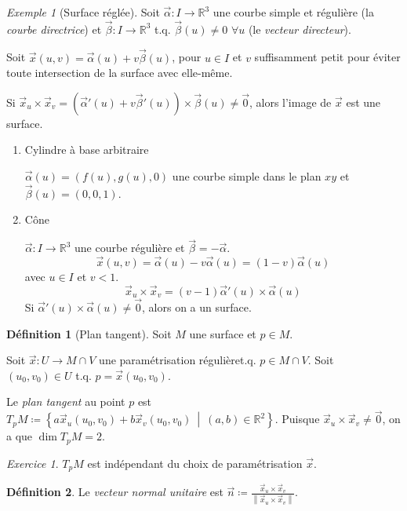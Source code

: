 \documentclass{report}
\theoremstyle{definition}
\newtheorem*{dfn}{D\'efinition}
\theoremstyle{remark}
\newtheorem*{exem}{Exemple}
\newtheorem*{exer}{Exercice}
\def\RR{\mathbb{R}}
\newcommand*{\norme}[1]{\left\|#1\right\|}
\begin{document}
	\begin{exem}[Surface r\'egl\'ee]
		Soit $\vec\alpha:I\to\RR^3$ une courbe simple et  r\'eguli\`ere (la \emph{courbe directrice}) et $\vec\beta:I\to\RR^3$ t.q. $\vec\beta(u)\neq0$ $\forall u$ (le \emph{vecteur directeur}).

		Soit $\vec x(u,v) = \vec\alpha(u) + v\vec\beta(u)$, pour $u\in I$ et $v$ suffisamment petit pour \'eviter toute intersection de la surface avec elle-m\^eme.

		Si $\vec x_u\times\vec x_v = \left(\vec\alpha'(u) + v\vec\beta'(u)\right) \times \vec\beta(u) \neq \vec0$, alors l'image de $\vec x$ est une surface.
		\begin{enumerate}
			\item Cylindre \`a base arbitraire

			$\vec\alpha(u) = (f(u),g(u),0)$ une courbe simple dans le plan $xy$ et $\vec\beta(u)=(0,0,1)$.
			\item C\^one

			$\vec\alpha:I\to\RR^3$ une courbe r\'eguli\`ere et $\vec\beta=-\vec\alpha$.
			\[ \vec x(u,v) = \vec\alpha(u)-v\vec\alpha(u) = (1-v)\vec\alpha(u) \] avec $u\in I$ et $v<1$.
			\[ \vec x_u\times\vec x_v = (v-1)\vec\alpha'(u) \times \vec\alpha(u) \] Si $\vec\alpha'(u) \times \vec\alpha(u) \neq \vec0$, alors on a un surface.
		\end{enumerate}
	\end{exem}

	\begin{dfn}[Plan tangent]
		Soit $M$ une surface et $p\in M$.

		Soit $\vec x:U\to M\cap V$ une param\'etrisation r\'eguli\`eret.q. $p\in M\cap V$. Soit $(u_0,v_0)\in U$ t.q. $p=\vec x(u_0,v_0)$.

		Le \emph{plan tangent} au point $p$ est $T_pM\coloneq \left\{ a\vec x_u(u_0,v_0) + b\vec x_v(u_0,v_0) ~\middle|~ (a,b)\in\RR^2 \right\}$. Puisque $\vec x_u\times\vec x_v\neq\vec0$, on a que $\dim T_pM=2$.
	\end{dfn}

	\begin{exer}
		$T_pM$ est ind\'ependant du choix de param\'etrisation $\vec x$.
	\end{exer}

	\begin{dfn}
		Le \emph{vecteur normal unitaire} est $\vec n \coloneq \frac{\vec x_u\times\vec x_v}{\norme{\vec x_u\times\vec x_v}}$.
	\end{dfn}
\end{document}
